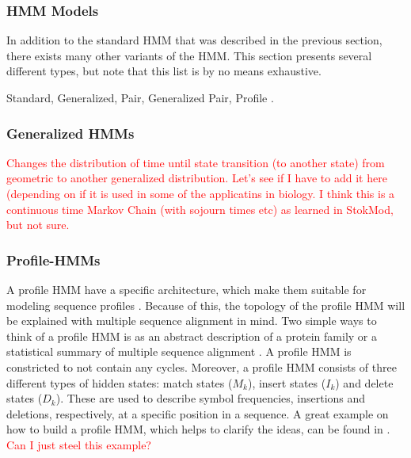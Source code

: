 \documentclass{article}
\begin{document}
\subsubsection{HMM Models}
In addition to the standard HMM that was described in the previous section, there exists many other variants of the HMM. This section presents several different types, but note that this list is by no means exhaustive. 

Standard, Generalized, Pair, Generalized Pair, Profile \cite{Choo2004}.

\subsubsection{Generalized HMMs}
\textcolor{red}{Changes the distribution of time until state transition (to another state) from geometric to another generalized distribution. Let's see if I have to add it here (depending on if it is used in some of the applicatins in biology. I think this is a continuous time Markov Chain (with sojourn times etc) as learned in StokMod, but not sure. } 

\subsubsection{Profile-HMMs}
A profile HMM have a specific architecture, which make them suitable for modeling sequence profiles \cite{Yoon2009}. Because of this, the topology of the profile HMM will be explained with multiple sequence alignment in mind. Two simple ways to think of a profile HMM is as an abstract description of a protein family or a statistical summary of multiple sequence alignment \cite{Christianini2006}. A profile HMM is constricted to not contain any cycles. Moreover, a profile HMM consists of three different types of hidden states: match states ($M_k$), insert states ($I_k$) and delete states ($D_k$). These are used to describe symbol frequencies, insertions and deletions, respectively, at a specific position in a sequence. A great example on how to build a profile HMM, which helps to clarify the ideas, can be found in \cite{Yoon2009}. \textcolor{red}{Can I just steel this example?}
\end{document}
